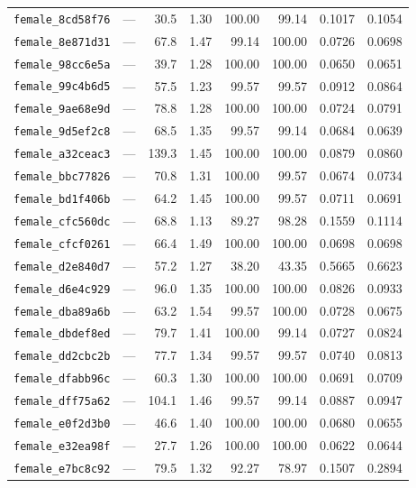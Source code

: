 \documentclass[11pt]{article}
\begin{document}
\begin{longtable}{lrrrrrrr}
\texttt{female\_8cd58f76} & --- & 30.5 & 1.30 & 100.00 & 99.14 & 0.1017 & 0.1054 \\
\texttt{female\_8e871d31} & --- & 67.8 & 1.47 & 99.14 & 100.00 & 0.0726 & 0.0698 \\
\texttt{female\_98cc6e5a} & --- & 39.7 & 1.28 & 100.00 & 100.00 & 0.0650 & 0.0651 \\
\texttt{female\_99c4b6d5} & --- & 57.5 & 1.23 & 99.57 & 99.57 & 0.0912 & 0.0864 \\
\texttt{female\_9ae68e9d} & --- & 78.8 & 1.28 & 100.00 & 100.00 & 0.0724 & 0.0791 \\
\texttt{female\_9d5ef2c8} & --- & 68.5 & 1.35 & 99.57 & 99.14 & 0.0684 & 0.0639 \\
\texttt{female\_a32ceac3} & --- & 139.3 & 1.45 & 100.00 & 100.00 & 0.0879 & 0.0860 \\
\texttt{female\_bbc77826} & --- & 70.8 & 1.31 & 100.00 & 99.57 & 0.0674 & 0.0734 \\
\texttt{female\_bd1f406b} & --- & 64.2 & 1.45 & 100.00 & 99.57 & 0.0711 & 0.0691 \\
\texttt{female\_cfc560dc} & --- & 68.8 & 1.13 & 89.27 & 98.28 & 0.1559 & 0.1114 \\
\texttt{female\_cfcf0261} & --- & 66.4 & 1.49 & 100.00 & 100.00 & 0.0698 & 0.0698 \\
\texttt{female\_d2e840d7} & --- & 57.2 & 1.27 & 38.20 & 43.35 & 0.5665 & 0.6623 \\
\texttt{female\_d6e4c929} & --- & 96.0 & 1.35 & 100.00 & 100.00 & 0.0826 & 0.0933 \\
\texttt{female\_dba89a6b} & --- & 63.2 & 1.54 & 99.57 & 100.00 & 0.0728 & 0.0675 \\
\texttt{female\_dbdef8ed} & --- & 79.7 & 1.41 & 100.00 & 99.14 & 0.0727 & 0.0824 \\
\texttt{female\_dd2cbc2b} & --- & 77.7 & 1.34 & 99.57 & 99.57 & 0.0740 & 0.0813 \\
\texttt{female\_dfabb96c} & --- & 60.3 & 1.30 & 100.00 & 100.00 & 0.0691 & 0.0709 \\
\texttt{female\_dff75a62} & --- & 104.1 & 1.46 & 99.57 & 99.14 & 0.0887 & 0.0947 \\
\texttt{female\_e0f2d3b0} & --- & 46.6 & 1.40 & 100.00 & 100.00 & 0.0680 & 0.0655 \\
\texttt{female\_e32ea98f} & --- & 27.7 & 1.26 & 100.00 & 100.00 & 0.0622 & 0.0644 \\
\texttt{female\_e7bc8c92} & --- & 79.5 & 1.32 & 92.27 & 78.97 & 0.1507 & 0.2894 \\

\end{longtable}
\end{document}
